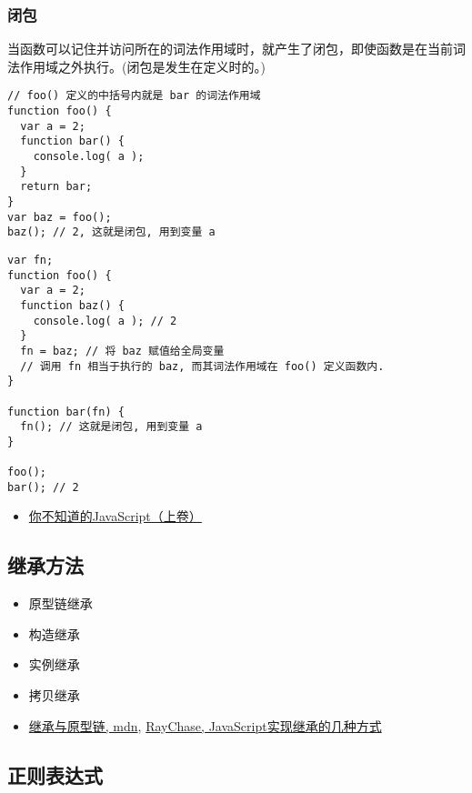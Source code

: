 \subsubsection{闭包}\label{ux95edux5305}

当函数可以记住并访问所在的词法作用域时，就产生了闭包，即使函数是在当前词法作用域之外执行。(闭包是发生在定义时的。)

\begin{lstlisting}
// foo() 定义的中括号内就是 bar 的词法作用域
function foo() {
  var a = 2;
  function bar() {
    console.log( a );
  }
  return bar;
}
var baz = foo();
baz(); // 2, 这就是闭包, 用到变量 a
\end{lstlisting}

\begin{lstlisting}
var fn;
function foo() {
  var a = 2;
  function baz() {
    console.log( a ); // 2
  }
  fn = baz; // 将 baz 赋值给全局变量
  // 调用 fn 相当于执行的 baz, 而其词法作用域在 foo() 定义函数内.
}

function bar(fn) {
  fn(); // 这就是闭包, 用到变量 a
}

foo();
bar(); // 2
\end{lstlisting}

\begin{itemize}
\tightlist
\item
  \href{http://book.douban.com/subject/26351021/}{你不知道的JavaScript（上卷）}
\end{itemize}

\subsection{继承方法}\label{ux7ee7ux627fux65b9ux6cd5}

\begin{itemize}
\item
  原型链继承
\item
  构造继承
\item
  实例继承
\item
  拷贝继承
\item
  \href{https://developer.mozilla.org/zh-CN/docs/Web/JavaScript/Inheritance_and_the_prototype_chain}{继承与原型链,
  mdn}, \href{http://raychase.iteye.com/blog/1337415}{RayChase,
  JavaScript实现继承的几种方式}
\end{itemize}

\subsection{正则表达式}\label{ux6b63ux5219ux8868ux8fbeux5f0f}

